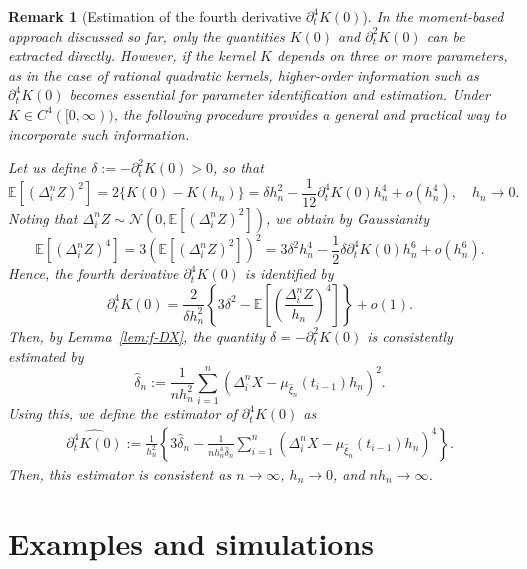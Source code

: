 \documentclass[a4paper,10pt,twoside]{article}
\newtheorem{remark}{Remark}[section]
\numberwithin{equation}{section}
\def\D{\Delta}
\def\d{\delta}
\def\l{\left}
\def\r{\right}
\def\p{\partial}
\def\wh#1{\widehat{#1}}
\begin{document}
\begin{remark}[Estimation of the fourth derivative $\p_t^4 K(0)$]\label{rem:K4}
In the moment-based approach discussed so far, only the quantities $K(0)$ and $\p_t^2 K(0)$ can be extracted directly. However, if the kernel $K$ depends on three or more parameters, as in the case of rational quadratic kernels, higher-order information such as $\p_t^4 K(0)$ becomes essential for parameter identification and estimation. 
Under $K\in C^4([0,\infty))$, the following procedure provides a general and practical way to incorporate such information.

Let us define $\d := -\p_t^2 K(0) > 0$, so that
\[
\mathbb{E}[(\D_i^n Z)^2] = 2\{K(0) - K(h_n)\} = \d h_n^2 - \frac{1}{12} \p_t^4 K(0) h_n^4 + o(h_n^4), \quad h_n \to 0.
\]
Noting that $\D_i^n Z \sim \mathcal{N}(0, \mathbb{E}[(\D_i^n Z)^2])$, we obtain by Gaussianity
\[
\mathbb{E}[(\D_i^n Z)^4] = 3 \left( \mathbb{E}[(\D_i^n Z)^2] \right)^2 
= 3 \d^2 h_n^4 - \frac{1}{2} \d \p_t^4 K(0) h_n^6 + o(h_n^6).
\]
Hence, the fourth derivative $\p_t^4 K(0)$ is identified by
\[
\p_t^4 K(0) = \frac{2}{\d h_n^2} \left\{3 \d^2 - \mathbb{E}\l[\l(\frac{\D_i^n Z}{h_n}\r)^4\r]  \right\} + o(1).
\]
Then, by Lemma~\ref{lem:f-DX}, the quantity $\d = -\p_t^2 K(0)$ is consistently estimated by
\[
\wh{\d}_n := \frac{1}{n h_n^2} \sum_{i=1}^n \left( \D_i^n X - \mu_{\widehat{\xi}_n}(t_{i-1}) h_n \right)^2.
\]
Using this, we define the estimator of $\p_t^4 K(0)$ as
\begin{align}
\widehat{\p_t^4 K(0)} := \frac{1}{h_n^2} \left\{3 \wh{\d}_n - \frac{1}{n h_n^4 \wh{\d}_n} \sum_{i=1}^n \left( \D_i^n X - \mu_{\widehat{\xi}_n}(t_{i-1}) h_n\right)^4  \right\}.\label{est:K4}
\end{align}
Then, this estimator is consistent as $n \to \infty$, $h_n \to 0$, and $n h_n \to \infty$.
\end{remark}

\section{Examples and simulations} \label{sec:example}
\end{document}
